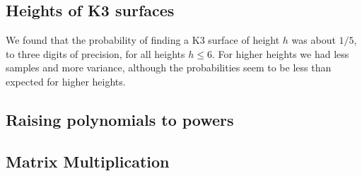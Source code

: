 
\subsection{Heights of K3 surfaces}

We found that the probability of finding a K3 surface
of height \(h\) was about \(1 / 5\), to three digits
of precision, for all heights \(h \leq 6\).
For higher heights we had less samples
and more variance, although
the probabilities seem to be less than expected
for higher heights.

\subsection{Raising polynomials to powers}

\subsection{Matrix Multiplication}
